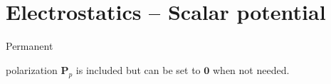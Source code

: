\documentclass[letterpaper]{article}
\newcommand{\vect}[1]{\mathbf#1}
\begin{document}









\clearpage
\section{Electrostatics -- Scalar potential}
\label{sec_esp}

\hypertarget{sec_esp}{Permanent} polarization $\vect{P}_p$ is included but can be set to $\vect{0}$ when not needed.
\end{document}
